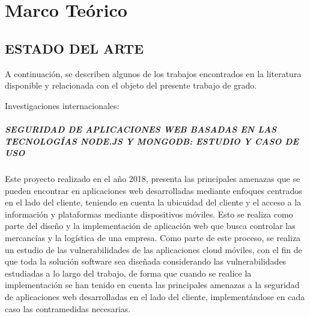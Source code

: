 \chapter{Marco Teórico}
\label{chap2:marcoteorico}

\begin{center}
    \item \section{ESTADO DEL ARTE}
\end{center}

A continuación, se describen algunos de los trabajos encontrados en la literatura disponible y relacionada con el objeto del presente trabajo de grado.


Investigaciones internacionales:

\paragraph{SEGURIDAD DE APLICACIONES WEB BASADAS EN LAS TECNOLOGÍAS NODE.JS Y MONGODB: ESTUDIO Y CASO DE USO \cite{PedroRuiz}}
Este proyecto realizado en el año 2018, presenta las principales amenazas que se pueden encontrar en aplicaciones web desarrolladas mediante enfoques centrados en el lado del cliente, teniendo en cuenta la ubicuidad del cliente y el acceso a la información y plataformas mediante dispositivos móviles. Esto se realiza como parte del diseño y la implementación de aplicación web que busca controlar las mercancías y la logística de una empresa. Como parte de este proceso, se realiza un estudio de las vulnerabilidades de las aplicaciones cloud móviles, con el fin de que toda la solución software sea diseñada considerando las vulnerabilidades estudiadas a lo largo del trabajo, de forma que cuando se realice la implementación se han tenido en cuenta las principales amenazas a la seguridad de aplicaciones web desarrolladas en el lado del cliente, implementándose en cada caso las contramedidas necesarias.

